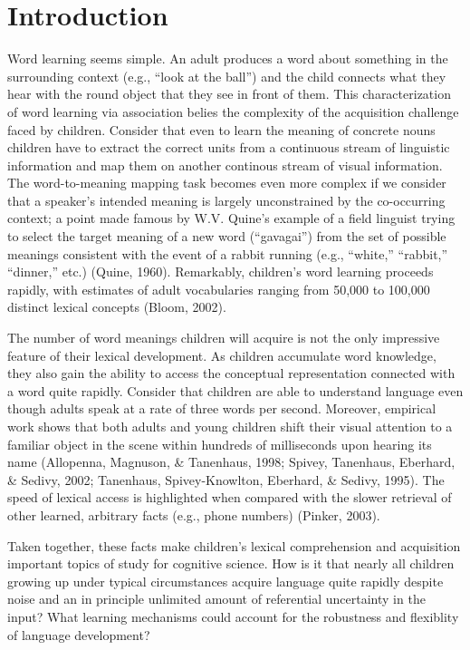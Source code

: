 \documentclass[oneside]{report}
\begin{document}
\afterpreface


\hypertarget{intro}{%
\chapter*{Introduction}\label{intro}}

Word learning seems simple. An adult produces a word about something in
the surrounding context (e.g., ``look at the ball'') and the child
connects what they hear with the round object that they see in front of
them. This characterization of word learning via association belies the
complexity of the acquisition challenge faced by children. Consider that
even to learn the meaning of concrete nouns children have to extract the
correct units from a continuous stream of linguistic information and map
them on another continous stream of visual information. The
word-to-meaning mapping task becomes even more complex if we consider
that a speaker's intended meaning is largely unconstrained by the
co-occurring context; a point made famous by W.V. Quine's example of a
field linguist trying to select the target meaning of a new word
(``gavagai'') from the set of possible meanings consistent with the
event of a rabbit running (e.g., ``white,'' ``rabbit,'' ``dinner,''
etc.) (Quine, 1960). Remarkably, children's word learning proceeds
rapidly, with estimates of adult vocabularies ranging from 50,000 to
100,000 distinct lexical concepts (Bloom, 2002).

The number of word meanings children will acquire is not the only
impressive feature of their lexical development. As children accumulate
word knowledge, they also gain the ability to access the conceptual
representation connected with a word quite rapidly. Consider that
children are able to understand language even though adults speak at a
rate of three words per second. Moreover, empirical work shows that both
adults and young children shift their visual attention to a familiar
object in the scene within hundreds of milliseconds upon hearing its
name (Allopenna, Magnuson, \& Tanenhaus, 1998; Spivey, Tanenhaus,
Eberhard, \& Sedivy, 2002; Tanenhaus, Spivey-Knowlton, Eberhard, \&
Sedivy, 1995). The speed of lexical access is highlighted when compared
with the slower retrieval of other learned, arbitrary facts (e.g., phone
numbers) (Pinker, 2003).

Taken together, these facts make children's lexical comprehension and
acquisition important topics of study for cognitive science. How is it
that nearly all children growing up under typical circumstances acquire
language quite rapidly despite noise and an in principle unlimited
amount of referential uncertainty in the input? What learning mechanisms
could account for the robustness and flexiblity of language development?
\end{document}
